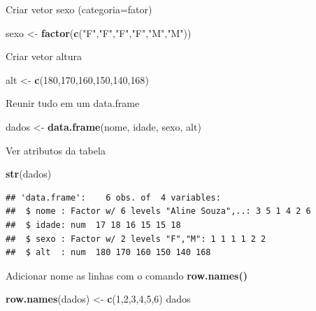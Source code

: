 \documentclass[]{book}
\newenvironment{Shaded}{\begin{snugshade}}{\end{snugshade}}
\newcommand{\DecValTok}[1]{\textcolor[rgb]{0.00,0.00,0.81}{#1}}
\newcommand{\KeywordTok}[1]{\textcolor[rgb]{0.13,0.29,0.53}{\textbf{#1}}}
\newcommand{\NormalTok}[1]{#1}
\newcommand{\StringTok}[1]{\textcolor[rgb]{0.31,0.60,0.02}{#1}}
\begin{document}
Criar vetor sexo (categoria=fator)

\begin{Shaded}
\begin{Highlighting}[]
\NormalTok{sexo <-}\StringTok{ }\KeywordTok{factor}\NormalTok{(}\KeywordTok{c}\NormalTok{(}\StringTok{"F"}\NormalTok{,}\StringTok{"F"}\NormalTok{,}\StringTok{"F"}\NormalTok{,}\StringTok{"F"}\NormalTok{,}\StringTok{"M"}\NormalTok{,}\StringTok{"M"}\NormalTok{))}
\end{Highlighting}
\end{Shaded}

Criar vetor altura

\begin{Shaded}
\begin{Highlighting}[]
\NormalTok{alt <-}\StringTok{ }\KeywordTok{c}\NormalTok{(}\DecValTok{180}\NormalTok{,}\DecValTok{170}\NormalTok{,}\DecValTok{160}\NormalTok{,}\DecValTok{150}\NormalTok{,}\DecValTok{140}\NormalTok{,}\DecValTok{168}\NormalTok{)}
\end{Highlighting}
\end{Shaded}

Reunir tudo em um data.frame

\begin{Shaded}
\begin{Highlighting}[]
\NormalTok{dados <-}\StringTok{ }\KeywordTok{data.frame}\NormalTok{(nome, idade, sexo, alt)}
\end{Highlighting}
\end{Shaded}

Ver atributos da tabela

\begin{Shaded}
\begin{Highlighting}[]
\KeywordTok{str}\NormalTok{(dados)}
\end{Highlighting}
\end{Shaded}

\begin{verbatim}
## 'data.frame':    6 obs. of  4 variables:
##  $ nome : Factor w/ 6 levels "Aline Souza",..: 3 5 1 4 2 6
##  $ idade: num  17 18 16 15 15 18
##  $ sexo : Factor w/ 2 levels "F","M": 1 1 1 1 2 2
##  $ alt  : num  180 170 160 150 140 168
\end{verbatim}

Adicionar nome as linhas com o comando \textbf{row.names()}

\begin{Shaded}
\begin{Highlighting}[]
\KeywordTok{row.names}\NormalTok{(dados) <-}\StringTok{ }\KeywordTok{c}\NormalTok{(}\DecValTok{1}\NormalTok{,}\DecValTok{2}\NormalTok{,}\DecValTok{3}\NormalTok{,}\DecValTok{4}\NormalTok{,}\DecValTok{5}\NormalTok{,}\DecValTok{6}\NormalTok{)}
\NormalTok{dados}
\end{Highlighting}
\end{Shaded}
\end{document}
